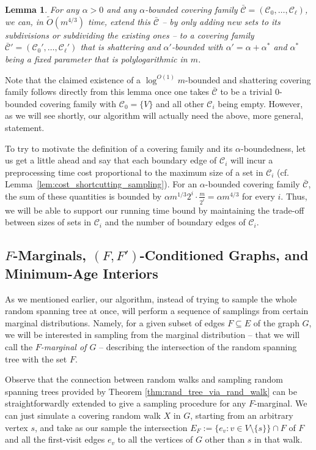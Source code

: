 \documentclass[11pt, letterpaper]{article}
\newtheorem{lemma}[theorem]{Lemma}
\newcommand{\cC}{\mathcal{C}}
\newcommand{\ocC}{\bar{\mathcal{C}}}
\newcommand{\tO}{\widetilde{O}}
\begin{document}
\begin{lemma}
\label{lem:partitioning_main}
For any $\alpha>0$ and any $\alpha$-bounded covering family $\ocC=(\cC_0,\ldots, \cC_{\ell})$, we can, in $\tO(m^{4/3})$ time, extend this $\ocC$ -- by only adding new sets to its  subdivisions or subdividing the existing ones -- to a covering family $\ocC'=(\cC_0',\ldots, \cC_{\ell}')$ that is shattering and $\alpha'$-bounded with $\alpha'=\alpha+\alpha^*$ and $\alpha^*$ being a fixed parameter that is polylogarithmic in $m$. 
\end{lemma}

Note that the claimed existence of a $\log^{O(1)}m$-bounded and shattering covering family follows directly from this lemma once one takes $\ocC$ to be a trivial $0$-bounded covering family with $\cC_0=\{V\}$ and all other $\cC_i$ being empty. However, as we will see shortly, our algorithm will actually need the above, more general, statement.

To try to motivate the definition of a covering family and its $\alpha$-boundedness, let us get a little ahead and say that
each boundary edge of $\cC_i$ will incur a preprocessing time cost proportional to the maximum size of a set in $\cC_i$ (cf. Lemma~\ref{lem:cost_shortcutting_sampling}).
For an $\alpha$-bounded covering family $\ocC$, the sum of these quantities is bounded by $\alpha m^{1/3} 2^i \cdot \frac{m}{2^i} = \alpha m^{4/3}$ for every $i$. Thus, we will be able to support our running time bound by maintaining the trade-off between sizes of sets in $\cC_i$ and the number of boundary edges of $\cC_i$.






\subsection{$F$-Marginals, $(F,F')$-Conditioned Graphs, and Minimum-Age Interiors}\label{sec:marginals_overview}

As we mentioned earlier, our algorithm, instead of trying to sample the whole random spanning tree at once, will perform a sequence of samplings from certain marginal distributions. Namely, for a given subset of edges $F\subseteq E$ of the graph $G$, we will be interested in sampling from the marginal distribution -- that we will call the {\em $F$-marginal of $G$} -- describing the intersection of the random spanning tree with the set $F$. 

Observe that the connection between random walks and sampling random spanning trees provided by Theorem \ref{thm:rand_tree_via_rand_walk} can be straightforwardly extended to give a sampling procedure for any $F$-marginal. We can just simulate a covering random walk $X$ in $G$, starting from an arbitrary vertex $s$, and take as our sample the intersection $E_{F}:= \{ e_v : v \in V \setminus \{s\} \} \cap F$ of $F$ and all the first-visit edges $e_v$ to all the vertices of $G$ other than $s$ in that walk. 
\end{document}
